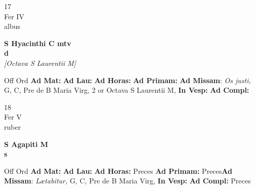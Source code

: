 \documentclass[10pt, openany]{book}
\begin{document}
        \begin{center}
            \begin{minipage}{3.5in}
                \vspace{2em}
                \begin{minipage}{0.5in}
                    {\Huge 17} \\
                    {\normalsize Fer IV} \\
                    {\normalsize albus}
                \end{minipage}
                \begin{minipage}{3.0in}
                    \textbf{ \large S Hyacinthi C mtv \\
                    \textnormal{\normalsize d}} \\ \textit{[Octava S Laurentii M]} \\ 
                \end{minipage}
                \begin{justify}Off Ord
                    \textbf{Ad Mat: }
                    \textbf{Ad Lau: }
                    \textbf{Ad Horas: }
                    \textbf{Ad Primam: }\textbf{Ad Missam}: \textit{Os justi,} G, C, Pre de B Maria Virg, 2 or Octava S Laurentii M,  
                    \textbf{In Vesp: }
                    \textbf{Ad Compl: }
                \end{justify}
            \end{minipage}
        \end{center}
    
        \begin{center}
            \begin{minipage}{3.5in}
                \vspace{2em}
                \begin{minipage}{0.5in}
                    {\Huge 18} \\
                    {\normalsize Fer V} \\
                    {\normalsize ruber}
                \end{minipage}
                \begin{minipage}{3.0in}
                    \textbf{ \large S Agapiti M \\
                    \textnormal{\normalsize s}} \\ 
                \end{minipage}
                \begin{justify}Off Ord
                    \textbf{Ad Mat: }
                    \textbf{Ad Lau: }
                    \textbf{Ad Horas: }Preces
                    \textbf{Ad Primam: }Preces\textbf{Ad Missam}: \textit{Lætabitur,} G, C, Pre de B Maria Virg,  
                    \textbf{In Vesp: }
                    \textbf{Ad Compl: }Preces
                \end{justify}
            \end{minipage}
        \end{center}
    
\end{document}
